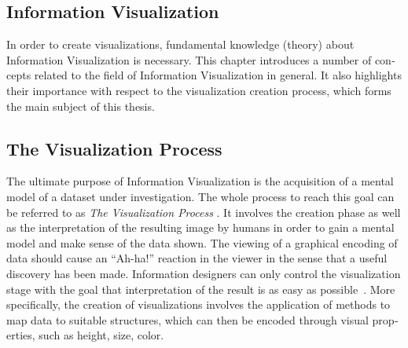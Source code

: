 \begin{english}

\chapter{Information Visualization}
\label{cha:infovis}


  


In order to create visualizations, fundamental knowledge (theory) about Information Visualization is necessary. This chapter introduces a number of concepts related to the field of Information Visualization in general. It also highlights their importance with respect to the visualization creation process, which forms the main subject of this thesis.


\section{The Visualization Process}

The ultimate purpose of Information Visualization is the acquisition of a mental model of a dataset under investigation. The whole process to reach this goal can be referred to as \emph{The Visualization Process} \cite{WuenscheLobb01}. It involves the creation phase as well as the interpretation of the resulting image by humans in order to gain a mental model and make sense of the data shown. The viewing of a graphical encoding of data should cause an ``Ah-ha!'' reaction in the viewer in the sense that a useful discovery has been made. Information designers can only control the visualization stage with the goal that interpretation of the result is as easy as possible~\cite{Holmberg06}. More specifically, the creation of visualizations involves the application of methods to map data to suitable structures, which can then be encoded through visual properties, such as height, size, color.





\end{english}
